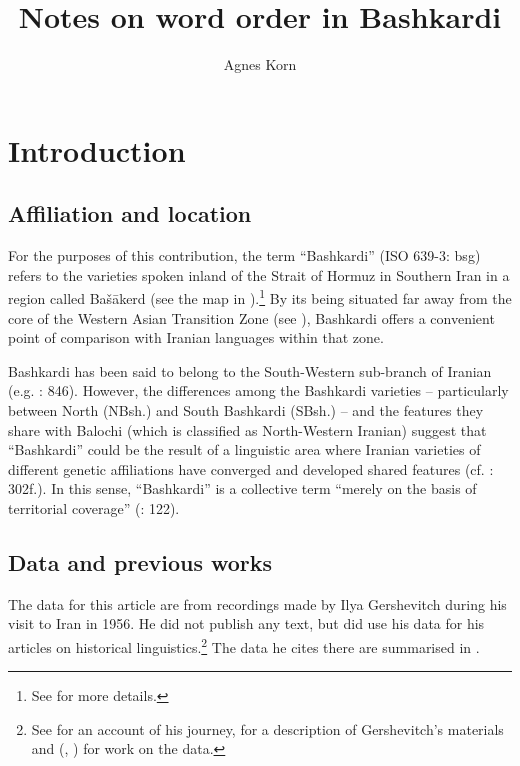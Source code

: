 \documentclass[output=paper,colorlinks,citecolor=brown]{langscibook}
\author{Agnes Korn\orcid{0000-0003-0302-6751}\affiliation{CNRS – UMR 8041 Centre de recherche sur le Monde iranien (CeRMI)}}
\title{Notes on word order in Bashkardi}
\begin{document}
\maketitle\label{WOWA:ch:5}

\section{Introduction}\label{Bashkardi:ss:1}

\subsection{Affiliation and location}\label{Bashkardi:ss:1.1}

For the purposes of this contribution, the term ``Bashkardi'' (ISO 639-3: bsg) refers to the varieties spoken inland of the Strait of Hormuz in Southern Iran in a region called Bašākerd (see the  {map} in ).\footnote{
See \citet[79–80]{korn_notes_2017} for more details. 
} By its being situated far away from the core of the Western Asian Transition Zone (see ), Bashkardi offers a convenient point of comparison with Iranian languages within that zone.

Bashkardi has been said to belong to the South-Western sub-branch of Iranian (e.g. \citealt{skjaervo1989baskardi}: 846). However, the differences among the Bashkardi varieties – particularly between North (NBsh.) and South Bashkardi (SBsh.) – and the features they share with Balochi (which is classified as North-Western Iranian) suggest that ``Bashkardi'' could be the result of a linguistic area where Iranian varieties of different genetic affiliations have converged and developed shared features (cf. \citealt{korn_greeting_2021}: 302f.). In this sense, ``Bashkardi'' is a collective term ``merely on the basis of territorial coverage'' (\citealt{voskanian2007lexical}: 122).

\largerpage

\subsection{Data and previous works}\label{Bashkardi:ss:1.2}

The data for this article are from recordings made by Ilya Gershevitch during his visit to Iran in 1956. He did not publish any text, but did use his data for his articles on historical linguistics.\footnote{
See \citet{gershevitch_travels_1959} for an account of his journey, \citet{korn_voices_2015} for a description of Gershevitch’s materials and \citeauthor{korn_notes_2017} (\citeyear[81]{korn_notes_2017}, \citeyear[301–302]{korn_greeting_2021}) for work on the data. 
} The data he cites there are summarised in \citet{skjaervo1989baskardi,skjaervo1989languages}. 
\end{document}
